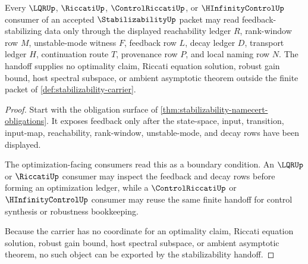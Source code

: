 \begin{theorem}
\label{thm:stabilizability-feedback-handoff}
Every $\LQRUp$, $\RiccatiUp$, $\ControlRiccatiUp$, or $\HInfinityControlUp$ consumer of an accepted $\StabilizabilityUp$ packet may read feedback-stabilizing data only through the displayed reachability ledger $R$, rank-window row $M$, unstable-mode witness $F$, feedback row $L$, decay ledger $D$, transport ledger $H$, continuation route $T$, provenance row $P$, and local naming row $N$. The handoff supplies no optimality claim, Riccati equation solution, robust gain bound, host spectral subspace, or ambient asymptotic theorem outside the finite packet of \autoref{def:stabilizability-carrier}.
\end{theorem}
\begin{proof}
Start with the obligation surface of \autoref{thm:stabilizability-namecert-obligations}. It exposes feedback only after the state-space, input, transition, input-map, reachability, rank-window, unstable-mode, and decay rows have been displayed.

The optimization-facing consumers read this as a boundary condition. An $\LQRUp$ or $\RiccatiUp$ consumer may inspect the feedback and decay rows before forming an optimization ledger, while a $\ControlRiccatiUp$ or $\HInfinityControlUp$ consumer may reuse the same finite handoff for control synthesis or robustness bookkeeping.

Because the carrier has no coordinate for an optimality claim, Riccati equation solution, robust gain bound, host spectral subspace, or ambient asymptotic theorem, no such object can be exported by the stabilizability handoff.
\end{proof}



